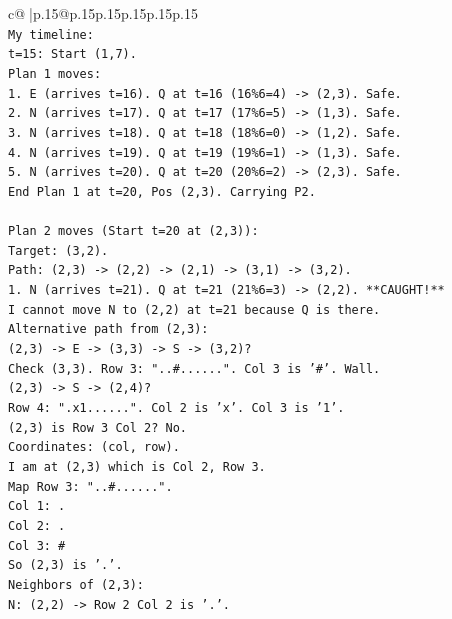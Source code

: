 \documentclass{article}
\begin{document}
{\begin{supertabular}{c@{$\;$}|p{.15\linewidth}@{}p{.15\linewidth}p{.15\linewidth}p{.15\linewidth}p{.15\linewidth}p{.15\linewidth}}
{{{\\ 
\texttt{My timeline:} \\
\texttt{t=15: Start (1,7).} \\
\texttt{Plan 1 moves:} \\
\texttt{1. E (arrives t=16). Q at t=16 (16\%6=4) {-}> (2,3). Safe.} \\
\texttt{2. N (arrives t=17). Q at t=17 (17\%6=5) {-}> (1,3). Safe.} \\
\texttt{3. N (arrives t=18). Q at t=18 (18\%6=0) {-}> (1,2). Safe.} \\
\texttt{4. N (arrives t=19). Q at t=19 (19\%6=1) {-}> (1,3). Safe.} \\
\texttt{5. N (arrives t=20). Q at t=20 (20\%6=2) {-}> (2,3). Safe.} \\
\texttt{End Plan 1 at t=20, Pos (2,3). Carrying P2.} \\
\\ 
\texttt{Plan 2 moves (Start t=20 at (2,3)):} \\
\texttt{Target: (3,2).} \\
\texttt{Path: (2,3) {-}> (2,2) {-}> (2,1) {-}> (3,1) {-}> (3,2).} \\
\texttt{1. N (arrives t=21). Q at t=21 (21\%6=3) {-}> (2,2). **CAUGHT!**} \\
\texttt{I cannot move N to (2,2) at t=21 because Q is there.} \\
\texttt{Alternative path from (2,3):} \\
\texttt{(2,3) {-}> E {-}> (3,3) {-}> S {-}> (3,2)?} \\
\texttt{Check (3,3). Row 3: "..\#......". Col 3 is '\#'. Wall.} \\
\texttt{(2,3) {-}> S {-}> (2,4)?} \\
\texttt{Row 4: ".x1......". Col 2 is 'x'. Col 3 is '1'.} \\
\texttt{(2,3) is Row 3 Col 2? No.} \\
\texttt{Coordinates: (col, row).} \\
\texttt{I am at (2,3) which is Col 2, Row 3.} \\
\texttt{Map Row 3: "..\#......".} \\
\texttt{Col 1: .} \\
\texttt{Col 2: .} \\
\texttt{Col 3: \#} \\
\texttt{So (2,3) is '.'.} \\
\texttt{Neighbors of (2,3):} \\
\texttt{N: (2,2) {-}> Row 2 Col 2 is '.'.} \\
}}}
\end{supertabular}}
\end{document}
